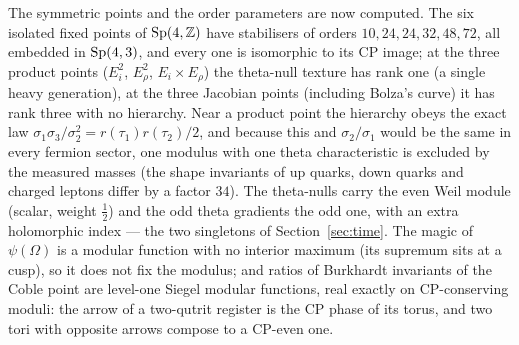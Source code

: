 The symmetric points and the order parameters are now computed. The six isolated fixed points of $\mathrm{Sp}(4,\mathbb{Z})$ have
stabilisers of orders $10,24,24,32,48,72$, all embedded in $\mathrm{Sp}(4,3)$, and every one is isomorphic to its CP image;
at the three product points ($E_i^2$, $E_\rho^2$, $E_i\times E_\rho$) the theta-null texture has rank one (a single
heavy generation), at the three Jacobian points (including Bolza's curve) it has rank three with no hierarchy. Near a
product point the hierarchy obeys the exact law $\sigma_1\sigma_3/\sigma_2^2=r(\tau_1)r(\tau_2)/2$, and because this
and $\sigma_2/\sigma_1$ would be the same in every fermion sector, one modulus with one theta characteristic is excluded
by the measured masses (the shape invariants of up quarks, down quarks and charged leptons differ by a factor $34$).
The theta-nulls carry the even Weil module (scalar, weight $\tfrac12$) and the odd theta gradients the odd one, with an
extra holomorphic index --- the two singletons of Section~\ref{sec:time}. The magic of $\psi(\Omega)$ is a modular
function with no interior maximum (its supremum sits at a cusp), so it does not fix the modulus; and ratios of
Burkhardt invariants of the Coble point are level-one Siegel modular functions, real exactly on CP-conserving moduli:
the arrow of a two-qutrit register is the CP phase of its torus, and two tori with opposite arrows compose to a
CP-even one. 

